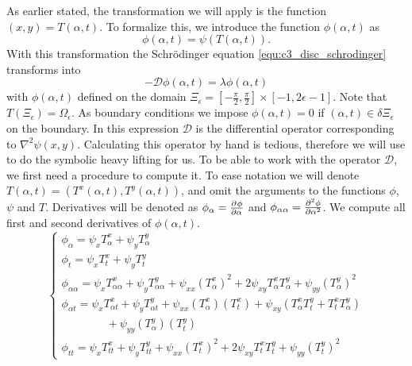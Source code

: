As earlier stated, the transformation we will apply is the function $(x, y) = T(\alpha, t)$. To formalize this, we introduce the function $\phi(\alpha, t)$ as
$$
    \phi(\alpha, t) = \psi(T(\alpha, t))\text{.}
$$
With this transformation the Schrödinger equation \eqref{equ:c3_disc_schrodinger} transforms into
\begin{equation}\label{equ:c3_disc_schrodinger_transformed}
    -\mathcal{D}\phi(\alpha, t) = \lambda\phi(\alpha, t)
\end{equation}
with $\phi(\alpha, t)$ defined on the domain $\Xi_\epsilon = \left[-\frac{\pi}{2}, \frac{\pi}{2}\right] \times [-1, 2\epsilon - 1]$. Note that $T(\Xi_\epsilon) = \Omega_\epsilon$. As boundary conditions we impose $\phi(\alpha, t) = 0$ if $(\alpha, t) \in \delta\Xi_\epsilon$ on the boundary. In this expression $\mathcal{D}$ is the differential operator corresponding to $\nabla^2\psi(x, y)$. Calculating this operator by hand is tedious, therefore we will use \sage to do the symbolic heavy lifting for us. To be able to work with the operator $\mathcal{D}$, we first need a procedure to compute it. To ease notation we will denote $T(\alpha, t) = (T^{x}(\alpha, t), T^{y}(\alpha, t))$, and omit the arguments to the functions $\phi$, $\psi$ and $T$. Derivatives will be denoted as $\phi_\alpha = \pdv[]{\phi}{\alpha}$ and $\phi_{\alpha\alpha} = \pdv[2]{\phi}{\alpha}$. We compute all first and second derivatives of $\phi(\alpha, t)$.
\begin{equation}\label{equ:disc_transformation_derivatives}
    \begin{cases}
        \phi_\alpha = \psi_x T^x_\alpha + \psi_y T^y_\alpha                                                                                                                   \\
        \phi_t = \psi_x T^x_t + \psi_y T^y_t                                                                                                                                  \\
        \phi_{\alpha\alpha} = \psi_x T^x_{\alpha\alpha} + \psi_y T^y_{\alpha\alpha} + \psi_{xx} (T^x_\alpha)^2 + 2 \psi_{xy} T^x_\alpha T^y_\alpha + \psi_{yy} (T^y_\alpha)^2 \\
        \phi_{\alpha t} = \psi_x T^x_{\alpha t} + \psi_y T^y_{\alpha t} + \psi_{xx} (T^x_\alpha)(T^x_t) + \psi_{xy} \left(T^x_\alpha T^y_t + T^x_t T^y_\alpha \right)         \\
        \quad\quad\quad\quad {} + \psi_{yy} (T^y_\alpha)(T^y_t)                                                                                                               \\
        \phi_{tt} = \psi_x T^x_{tt} + \psi_y T^y_{tt} + \psi_{xx} (T^x_t)^2 + 2 \psi_{xy} T^x_t T^y_t + \psi_{yy} (T^y_t)^2
    \end{cases}
\end{equation}

